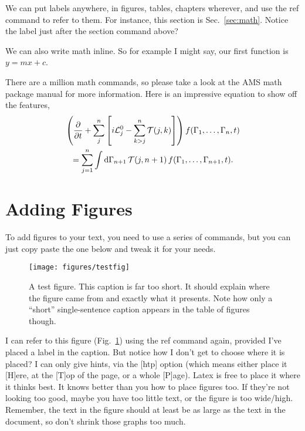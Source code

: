\documentclass[12pt, BEng]{UoAThesis}
\begin{document}
We can put labels anywhere, in figures, tables, chapters wherever, and
use the ref command to refer to them. For instance, this section is
Sec.~\ref{sec:math}. Notice the label just after the section command
above?

We can also write math inline. So for example I might say, our first
function is $y=mx+c$. 

There are a million math commands, so please take a look at the AMS
math package manual for more information. Here is an impressive 
equation to show off the features,
\begin{multline}
  \left( \frac{\partial}{\partial t} + \sum_{j}^n \left[ i{\mathcal
        L}^0_j - \sum_{k > j}^n {\mathcal T}(j,k) \right]\right)
  f({\Gamma}_1,\dots,{\Gamma}_n,t)
  \\
  = \sum_{j=1}^{n} \int {\rm d}{\Gamma}_{n+1}\, {\mathcal T}(j,n+1)\,
  f({\Gamma}_1,\dots,{\Gamma}_{n+1},t).
\end{multline}

\section{Adding Figures}
To add figures to your text, you need to use a series of commands, but
you can just copy paste the one below and tweak it for your needs.
\begin{figure}[htp]
  \centering
  \texttt{[image: figures/testfig]}
  \caption[A test figure..or is it]{\label{fig:testfig} A test figure. This
    caption is far too short. It should explain where the figure came
    from and exactly what it presents. Note how only a ``short''
    single-sentence caption appears in the table of figures though.}
\end{figure}

I can refer to this figure (Fig.~\ref{fig:testfig}) using the ref
command again, provided I've placed a label in the caption. But notice
how I don't get to choose where it is placed? I can only give hints,
via the [htp] option (which means either place it [H]ere, at the [T]op
of the page, or a whole [P]age). Latex is free to place it where it
thinks best. It knows better than you how to place figures too. If
they're not looking too good, maybe you have too little text, or the
figure is too wide/high. Remember, the text in the figure should at
least be as large as the text in the document, so don't shrink those
graphs too much.
\end{document}
